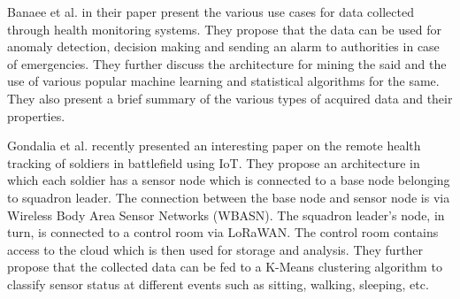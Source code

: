 Banaee et al. \cite{banaee2013data} in their paper present the various use cases for data collected through health monitoring systems. They propose that the data can be used for anomaly detection, decision making and sending an alarm to authorities in case of emergencies. They further discuss the architecture for mining the said and the use of various popular machine learning and statistical algorithms for the same. They also present a brief summary of the various types of acquired data and their properties.


Gondalia et al.\cite{gondalia2018iot} recently presented an interesting paper on the remote health tracking of soldiers in battlefield using IoT. They propose an architecture in which each soldier has a sensor node which is connected to a base node belonging to squadron leader. The connection between the base node and sensor node is via Wireless Body Area Sensor Networks (WBASN). The squadron leader's node, in turn, is connected to a control room via LoRaWAN. The control room contains access to the cloud which is then used for storage and analysis. They further propose that the collected data can be fed to a K-Means clustering algorithm to classify sensor status at different events such as sitting, walking, sleeping, etc.

